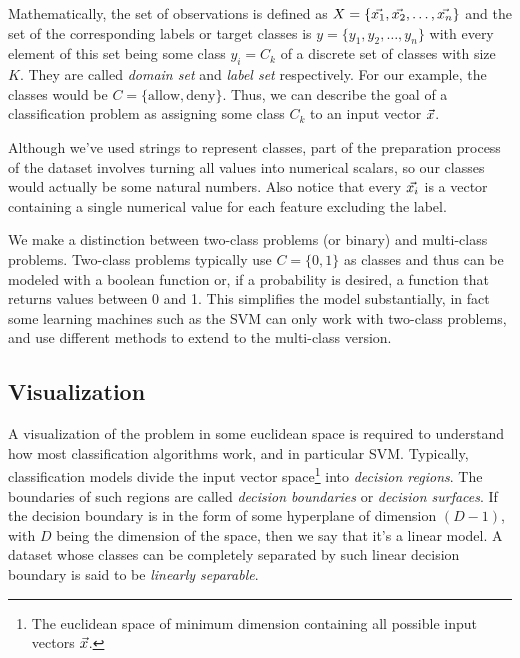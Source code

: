 Mathematically, the set of observations is defined as $X = \{\vec{x_1}, \vec{x_2}, \dots, \vec{x_n}\}$ and the set of the corresponding labels or target classes is $y = \{y_1, y_2, \dots, y_n\}$ with every element of this set being some class $y_i = C_k$ of a discrete set of classes with size $K$. They are called \emph{domain set} and \emph{label set} respectively. For our example, the classes would be $C = \{\text{allow}, \text{deny}\}$. Thus, we can describe the goal of a classification problem as assigning some class $C_k$ to an input vector $\vec{x}$.

Although we've used strings to represent classes, part of the preparation process of the dataset involves turning all values into numerical scalars, so our classes would actually be some natural numbers. Also notice that every $\vec{x_i}$ is a vector containing a single numerical value for each feature excluding the label. 

We make a distinction between two-class problems (or binary) and multi-class problems. Two-class problems typically use $C = \{0, 1\}$ as classes and thus can be modeled with a boolean function or, if a probability is desired, a function that returns values between 0 and 1. This simplifies the model substantially, in fact some learning machines such as the SVM can only work with two-class problems, and use different methods to extend to the multi-class version.

\subsection{Visualization}

A visualization of the problem in some euclidean space is required to understand how most classification algorithms work, and in particular SVM. Typically, clas\-si\-fi\-cation models divide the input vector space\footnote{The euclidean space of minimum dimension containing all possible input vectors $\vec{x}$.} into \emph{decision regions}. The boundaries of such regions are called \emph{decision boundaries} or \emph{decision surfaces}. If the decision boundary is in the form of some hyperplane of dimension $(D - 1)$, with $D$ being the dimension of the space, then we say that it's a linear model. A dataset whose classes can be completely separated by such linear decision boundary is said to be \emph{linearly separable}.

